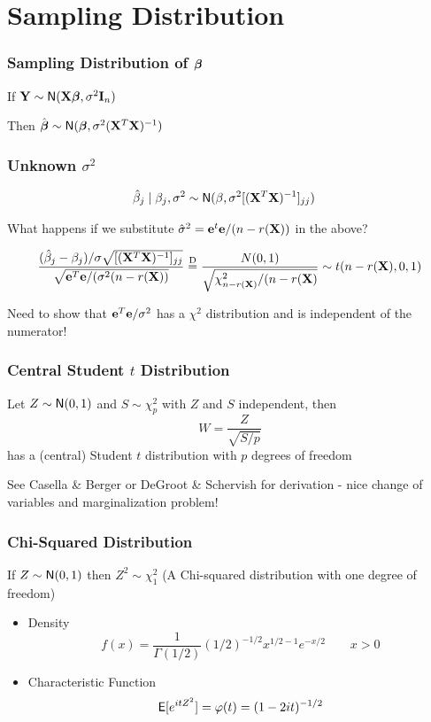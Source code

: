 \documentclass[handout]{beamer}
\begin{document}
\section{Sampling Distribution}



\begin{frame}
  \frametitle{Sampling Distribution of $\boldsymbol{\beta}$}
If  $\mathbf{Y} \sim \textsf{N}(\mathbf{X}\boldsymbol{\beta}, \sigma^2 \mathbf{I}_n)$

Then $\hat{\boldsymbol{\beta}} \sim \textsf{N}(\boldsymbol{\beta}, \sigma^2 (\mathbf{X}^T\mathbf{X})^{-1})$
\vfill

\end{frame}


\begin{frame} \frametitle{Unknown $\sigma^2$}

  \begin{align*}
    \hat{\beta}_j \mid \beta_j, \sigma^2 & \sim \textsf{N}(\beta, { \sigma^2}
                                           [(\mathbf{X}^T\mathbf{X})^{-1}]_{jj})
  \end{align*}  \pause

What happens if we substitute $\hat{\sigma}^2 = \mathbf{e}^t\mathbf{e}/(n-r(\mathbf{X}))$ in the above? \pause

$$
\frac{(\hat{\beta}_j - \beta_j)/ \sigma \sqrt{ [(\mathbf{X}^T\mathbf{X})^{-1}]_{jj}}}
{\sqrt{\mathbf{e}^T\mathbf{e}/ (\sigma^2 (n - r(\mathbf{X}))} } \mathrel{\mathop{=}\limits^{\rm D}}
\frac{N(0,1)}{\sqrt{\chi_{n-r(\mathbf{X})}^2/(n - r(\mathbf{X})}} \sim t(n - r(\mathbf{X}), 0 ,1)
$$

Need to show that $\mathbf{e}^T\mathbf{e} /\sigma^2$ has a $\chi^2$ distribution and
is independent of the numerator!
\end{frame}

\begin{frame}
  \frametitle{Central Student $t$ Distribution}
  \begin{definition}
    Let $Z \sim \textsf{N}(0, 1)$ and $S \sim \chi^2_p$ with $Z$ and $S$
    independent, \pause then
 $$ W = \frac{Z} {\sqrt{S/p}}$$
has a (central) Student $t$ distribution with $p$ degrees of freedom
  \end{definition}
\pause
 
See Casella \& Berger or DeGroot \& Schervish for derivation - nice change of variables and marginalization problem!
\end{frame}






\begin{frame}
  \frametitle{Chi-Squared Distribution}
  \begin{Definition}
    If $Z \sim \textsf{N}(0,1)$ then $Z^2 \sim \chi^2_1$ (A Chi-squared
    distribution with one degree of freedom) \pause
    \begin{itemize}
    \item Density
$$
f(x) = \frac{1}{\Gamma(1/2)} (1/2)^{-1/2} x^{1/2 - 1} e^{-x/2} \qquad x
> 0
$$ \pause
  \item  Characteristic Function
$$
\textsf{E}[e^{itZ^2}] = \varphi(t) = (1 - 2 i t)^{-1/2}
$$
  \end{itemize}

\end{Definition}
\end{frame}
\end{document}
